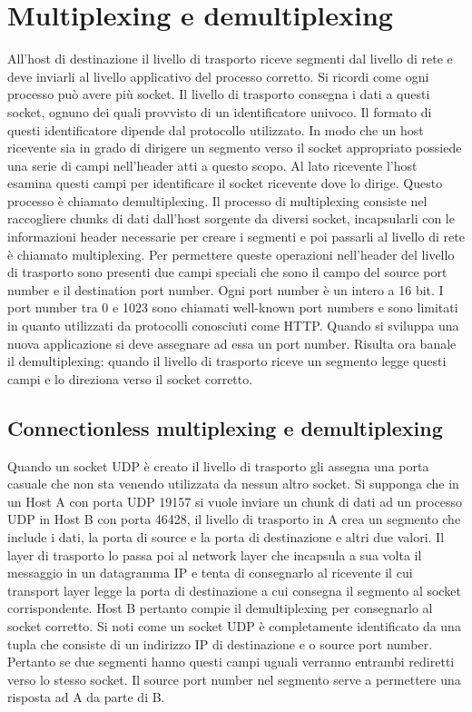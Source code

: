 \section{Multiplexing e demultiplexing}
All'host di destinazione il livello di trasporto riceve segmenti dal livello di rete e deve inviarli al livello applicativo del processo corretto. Si 
ricordi come ogni processo pu\`o avere pi\`u socket. Il livello di trasporto consegna i dati a questi socket, ognuno dei quali provvisto di un 
identificatore univoco. Il formato di questi identificatore dipende dal protocollo utilizzato. In modo che un host ricevente sia in grado di dirigere un 
segmento verso il socket appropriato possiede una serie di campi nell'header atti a questo scopo. Al lato ricevente l'host esamina questi campi per 
identificare il socket ricevente dove lo dirige. Questo processo \`e chiamato demultiplexing. Il processo di multiplexing consiste nel raccogliere chunks di 
dati dall'host sorgente da diversi socket, incapsularli con le informazioni header necessarie per creare i segmenti e poi passarli al livello di rete \`e 
chiamato multiplexing. Per permettere queste operazioni nell'header del livello di trasporto sono presenti due campi speciali che sono il campo del source 
port number e il destination port number. Ogni port number \`e un intero a 16 bit. I port number tra 0 e 1023 sono chiamati well-known port numbers e sono 
limitati in quanto utilizzati da protocolli conosciuti come HTTP. Quando si sviluppa una nuova applicazione si deve assegnare ad essa un port number. 
Risulta ora banale il demultiplexing: quando il livello di trasporto riceve un segmento legge questi campi e lo direziona verso il socket corretto. 
\subsection{Connectionless multiplexing e demultiplexing}
Quando un socket UDP \`e creato il livello di trasporto gli assegna una porta casuale che non sta venendo utilizzata da nessun altro socket. Si supponga che
in un Host A con porta UDP 19157 si vuole inviare un chunk di dati ad un processo UDP in Host B con porta 46428, il livello di trasporto in A crea un 
segmento che include i dati, la porta di source e la porta di destinazione e altri due valori. Il layer di trasporto lo passa poi al network layer che 
incapsula a sua volta il messaggio in un datagramma IP e tenta di consegnarlo al ricevente il cui transport layer legge la porta di destinazione a cui 
consegna il segmento al socket corrispondente. Host B pertanto compie il demultiplexing per consegnarlo al socket corretto. Si noti come un socket UDP \`e
completamente identificato da una tupla che consiste di un indirizzo IP di destinazione e o source port number. Pertanto se due segmenti hanno questi campi
uguali verranno entrambi rediretti verso lo stesso socket. Il source port number nel segmento serve a permettere una risposta ad A da parte di B. 
